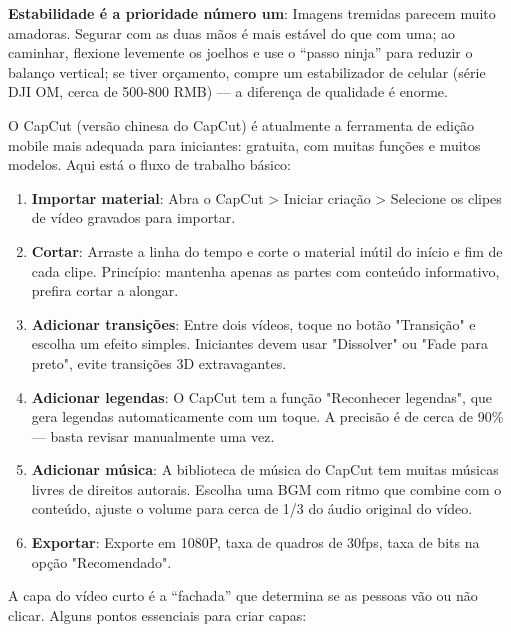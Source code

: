 \textbf{Estabilidade é a prioridade número um}: Imagens tremidas parecem muito amadoras. Segurar com as duas mãos é mais estável do que com uma; ao caminhar, flexione levemente os joelhos e use o “passo ninja” para reduzir o balanço vertical; se tiver orçamento, compre um estabilizador de celular (série DJI OM, cerca de 500-800 RMB) — a diferença de qualidade é enorme.


O CapCut (versão chinesa do CapCut) é atualmente a ferramenta de edição mobile mais adequada para iniciantes: gratuita, com muitas funções e muitos modelos. Aqui está o fluxo de trabalho básico:

\begin{enumerate}
  \item \textbf{Importar material}: Abra o CapCut > Iniciar criação > Selecione os clipes de vídeo gravados para importar.
  \item \textbf{Cortar}: Arraste a linha do tempo e corte o material inútil do início e fim de cada clipe. Princípio: mantenha apenas as partes com conteúdo informativo, prefira cortar a alongar.
  \item \textbf{Adicionar transições}: Entre dois vídeos, toque no botão "Transição" e escolha um efeito simples. Iniciantes devem usar "Dissolver" ou "Fade para preto", evite transições 3D extravagantes.
  \item \textbf{Adicionar legendas}: O CapCut tem a função "Reconhecer legendas", que gera legendas automaticamente com um toque. A precisão é de cerca de 90\% — basta revisar manualmente uma vez.
  \item \textbf{Adicionar música}: A biblioteca de música do CapCut tem muitas músicas livres de direitos autorais. Escolha uma BGM com ritmo que combine com o conteúdo, ajuste o volume para cerca de 1/3 do áudio original do vídeo.
  \item \textbf{Exportar}: Exporte em 1080P, taxa de quadros de 30fps, taxa de bits na opção "Recomendado".
\end{enumerate}


A capa do vídeo curto é a “fachada” que determina se as pessoas vão ou não clicar. Alguns pontos essenciais para criar capas:

